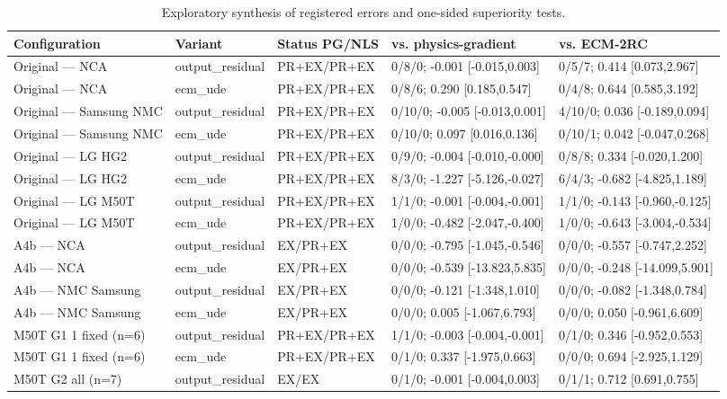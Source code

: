 \begin{table}[t]
\centering
\footnotesize
\setlength{\tabcolsep}{2pt}
\caption{Exploratory synthesis of registered errors and one-sided superiority tests.}
\label{tab:reviewer-round2-synthesis}
\begin{tabular}{lllll}
\toprule
Configuration & Variant & Status PG/NLS & vs. physics-gradient & vs. ECM-2RC \\
\midrule
Original — NCA & output\_residual & PR+EX/PR+EX & 0/8/0; -0.001 [-0.015,0.003] & 0/5/7; 0.414 [0.073,2.967] \\
Original — NCA & ecm\_ude & PR+EX/PR+EX & 0/8/6; 0.290 [0.185,0.547] & 0/4/8; 0.644 [0.585,3.192] \\
Original — Samsung NMC & output\_residual & PR+EX/PR+EX & 0/10/0; -0.005 [-0.013,0.001] & 4/10/0; 0.036 [-0.189,0.094] \\
Original — Samsung NMC & ecm\_ude & PR+EX/PR+EX & 0/10/0; 0.097 [0.016,0.136] & 0/10/1; 0.042 [-0.047,0.268] \\
Original — LG HG2 & output\_residual & PR+EX/PR+EX & 0/9/0; -0.004 [-0.010,-0.000] & 0/8/8; 0.334 [-0.020,1.200] \\
Original — LG HG2 & ecm\_ude & PR+EX/PR+EX & 8/3/0; -1.227 [-5.126,-0.027] & 6/4/3; -0.682 [-4.825,1.189] \\
Original — LG M50T & output\_residual & PR+EX/PR+EX & 1/1/0; -0.001 [-0.004,-0.001] & 1/1/0; -0.143 [-0.960,-0.125] \\
Original — LG M50T & ecm\_ude & PR+EX/PR+EX & 1/0/0; -0.482 [-2.047,-0.400] & 1/0/0; -0.643 [-3.004,-0.534] \\
A4b — NCA & output\_residual & EX/PR+EX & 0/0/0; -0.795 [-1.045,-0.546] & 0/0/0; -0.557 [-0.747,2.252] \\
A4b — NCA & ecm\_ude & EX/PR+EX & 0/0/0; -0.539 [-13.823,5.835] & 0/0/0; -0.248 [-14.099,5.901] \\
A4b — NMC Samsung & output\_residual & EX/PR+EX & 0/0/0; -0.121 [-1.348,1.010] & 0/0/0; -0.082 [-1.348,0.784] \\
A4b — NMC Samsung & ecm\_ude & EX/PR+EX & 0/0/0; 0.005 [-1.067,6.793] & 0/0/0; 0.050 [-0.961,6.609] \\
M50T G1 1 fixed (n=6) & output\_residual & PR+EX/PR+EX & 1/1/0; -0.003 [-0.004,-0.001] & 0/1/0; 0.346 [-0.952,0.553] \\
M50T G1 1 fixed (n=6) & ecm\_ude & PR+EX/PR+EX & 0/1/0; 0.337 [-1.975,0.663] & 0/0/0; 0.694 [-2.925,1.129] \\
M50T G2 all (n=7) & output\_residual & EX/EX & 0/1/0; -0.001 [-0.004,0.003] & 0/1/1; 0.712 [0.691,0.755] \\

\end{tabular}
\end{table}
